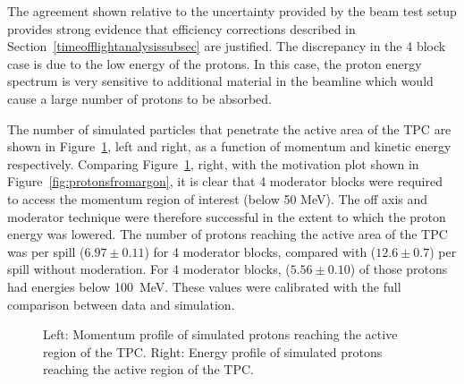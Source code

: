 The agreement shown relative to the uncertainty provided by the beam test setup provides strong evidence that efficiency corrections described in Section~\ref{timeofflightanalysissubsec} are justified.
The discrepancy in the 4 block case is due to the low energy of the protons.
In this case, the proton energy spectrum is very sensitive to additional material in the beamline which would cause a large number of protons to be absorbed.

The number of simulated particles that penetrate the active area of the TPC are shown in Figure~\ref{fig:MCTPC}, left and right, as a function of momentum and kinetic energy respectively.
Comparing Figure~\ref{fig:MCTPC}, right, with the motivation plot shown in Figure~\ref{fig:protonsfromargon}, it is clear that 4 moderator blocks were required to access the momentum region of interest (below 50 MeV).
The off axis and moderator technique were therefore successful in the extent to which the proton energy was lowered.
The number of protons reaching the active area of the TPC was  per spill ($6.97 \pm  0.11$) for 4 moderator blocks, compared with ($12.6 \pm 0.7$) per spill without moderation. 
For 4 moderator blocks, ($5.56 \pm  0.10$) of those protons had energies below 100~MeV.
These values were calibrated with the full comparison between data and simulation.

\begin{figure}[!ht]
  \begin{minipage}[t]{0.48\textwidth}
    \begin{adjustbox}{max totalsize={\textwidth}{.35\textheight}, center}
      
    \end{adjustbox}
  \end{minipage}
  \hspace{0.3cm}
  \begin{minipage}[t]{0.48\textwidth}
    \begin{adjustbox}{max totalsize={\textwidth}{.35\textheight}, center}
      
    \end{adjustbox}
    
  \end{minipage}
  \caption{Left: Momentum profile of simulated protons reaching the active region of the TPC. Right: Energy profile of simulated protons reaching the active region of the TPC.}
  \label{fig:MCTPC}	
\end{figure}
    
